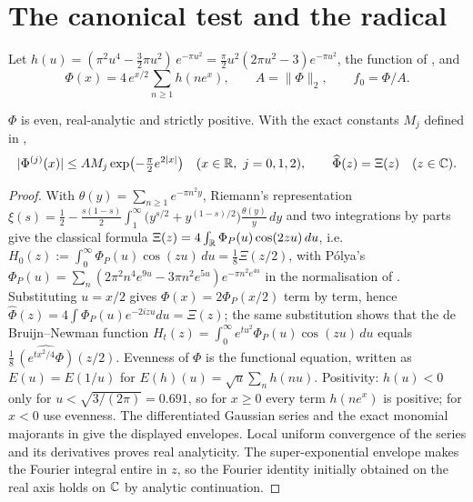 \section{The canonical test and the radical}\label{sec:canonical}

\begin{definition}\label{def:f0}
Let $h(u)=(\pi^2u^4-\tfrac32\pi u^2)\,e^{-\pi u^2}=\tfrac\pi2u^2(2\pi u^2-3)e^{-\pi u^2}$, the function of
\cite[(7.1)]{CCM-ZST-2025}, and
\begin{equation}\label{eq:Phi}
 \Phi(x)=4\,e^{x/2}\sum_{n\ge1}h(ne^{x}),\qquad A=\|\Phi\|_2,\qquad f_0=\Phi/A .
\end{equation}
\end{definition}

\begin{theorem}\label{thm:FPhi}
$\Phi$ is even, real-analytic and strictly positive. With the exact
constants $M_j$ defined in ,
\[
 |\Phi^{(j)}(x)|\le A M_j
          \exp\bigl(-\tfrac\pi2e^{2|x|}\bigr)
 \quad(x\in\mathbb R,\ j=0,1,2),
 \qquad \widehat\Phi(z)=\Xi(z)\quad(z\in\mathbb C).
\]
\end{theorem}
\begin{proof}
With $\theta(y)=\sum_{n\ge1}e^{-\pi n^2y}$, Riemann's representation
$\xi(s)=\tfrac12-\tfrac{s(1-s)}{2}\int_1^\infty\bigl(y^{s/2}+y^{(1-s)/2}\bigr)\frac{\theta(y)}{y}\,dy$
and two integrations by parts give the classical formula $\Xi(z)=4\int_{\mathbb R}\Phi_P(u)\cos(2zu)\,du$, i.e.\
$H_0(z):=\int_0^\infty\Phi_P(u)\cos(zu)\,du=\tfrac18\Xi(z/2)$, with P\'olya's
$\Phi_P(u)=\sum_n(2\pi^2n^4e^{9u}-3\pi n^2e^{5u})e^{-\pi n^2e^{4u}}$ in the normalisation of \cite{RodgersTao2018,Polymath15}.
Substituting $u=x/2$ gives $\Phi(x)=2\Phi_P(x/2)$ term by term, hence $\widehat\Phi(z)=4\int\Phi_P(u)e^{-2izu}du=\Xi(z)$; the same
substitution shows that the de Bruijn--Newman function $H_t(z)=\int_0^\infty e^{tu^2}\Phi_P(u)\cos(zu)\,du$ equals
$\tfrac18\,\widehat{(e^{tx^2/4}\Phi)}(z/2)$. Evenness of $\Phi$ is the functional equation, written as $E(u)=E(1/u)$ for
$E(h)(u)=\sqrt u\sum_nh(nu)$. Positivity: $h(u)<0$ only for $u<\sqrt{3/(2\pi)}=0.691$, so for $x\ge0$ every term $h(ne^x)$ is positive;
for $x<0$ use evenness. The differentiated Gaussian series and the exact monomial majorants
in \Cref{app:constants} give the displayed envelopes. Local uniform
convergence of the series and its derivatives proves real analyticity.
The super-exponential envelope makes the Fourier integral entire in
$z$, so the Fourier identity initially obtained on the real axis holds
on $\mathbb C$ by analytic continuation.
\end{proof}

